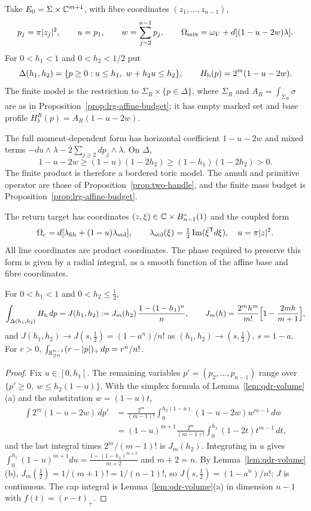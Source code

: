 \begin{definition}\label{def:lrg-mixed-model}
Take $E_0=\Sigma\times\mathbb{C}^{m+1}$, with fibre coordinates $(z_1,\dots,z_{n-1})$,
\[
 p_j=\pi|z_j|^2,\qquad u=p_1,\qquad w=\sum_{j=2}^{n-1}p_j,\qquad
 \Omega_{\rm mix}=\omega_V+d[(1-u-2w)\lambda].
\]
For $0<h_1<1$ and $0<h_2<1/2$ put
\[
 \Delta(h_1,h_2)=\{p\ge0:u\le h_1,\ w+h_2u\le h_2\},\qquad
 \Hb(p)=2^m(1-u-2w).
\]
The finite model is the restriction to $\Sigma_R\times\{p\in\Delta\}$, where $\Sigma_R$ and $A_R=\int_{\Sigma_R}\sigma$
are as in Proposition~\ref{prop:lrg-affine-budget}; it has empty marked set and base profile $H_b^R(p)=A_R(1-u-2w)$.
\end{definition}

The full moment-dependent form has horizontal coefficient $1-u-2w$ and mixed terms
$-du\wedge\lambda-2\sum_{j\ge2}dp_j\wedge\lambda$. On $\Delta$,
\begin{equation}\label{eq:lrg-mixed-positive}
 1-u-2w\ge(1-u)(1-2h_2)\ge(1-h_1)(1-2h_2)>0.
\end{equation}
The finite product is therefore a bordered toric model. The annuli and primitive operator are those of
Proposition~\ref{prop:two-handle}, and the finite mass budget is Proposition~\ref{prop:lrg-affine-budget}.

The return target has coordinates $(z,\xi)\in\mathbb{C}\times B^{\circ}_{n-1}(1)$ and the coupled form
\[
 \Omega_c=d[\lambda_{\rm fib}+(1-u)\lambda_{\rm std}],\qquad
 \lambda_{\rm std}(\xi)=\tfrac12\operatorname{Im}(\bar\xi^{\mathsf T}d\xi),\quad u=\pi|z|^2.
\]
All line coordinates are product coordinates. The phase required to preserve this form is given by a radial integral,
as a smooth function of the affine base and fibre coordinates.

\begin{lemma}\label{lem:lrg-mixed-volume}
For $0<h_1<1$ and $0<h_2\le\frac12$,
\[
 \int_{\Delta(h_1,h_2)}H_{\mathrm b}\,dp=J(h_1,h_2):=J_m(h_2)\,\frac{1-(1-h_1)^n}{n},\qquad
 J_m(h)=\frac{2^mh^m}{m!}\Bigl[1-\frac{2mh}{m+1}\Bigr],
\]
and $J(h_1,h_2)\to J(s,\frac12)=(1-a^n)/n!$ as $(h_1,h_2)\to(s,\frac12)$, $s=1-a$. For $r>0$,
$\int_{\mathbb{R}^{n-1}_{\ge0}}(r-|p|)_+\,dp=r^n/n!$.
\end{lemma}

\begin{proof}
Fix $u\in[0,h_1]$. The remaining variables $p'=(p_2,\dots,p_{n-1})$ range over $\{p'\ge0,\ w\le h_2(1-u)\}$. With
the simplex formula of Lemma~\ref{lem:qdr-volume}(a) and the substitution $w=(1-u)t$,
\begin{align*}
 \int 2^m(1-u-2w)\,dp'&=\frac{2^m}{(m-1)!}\int_0^{h_2(1-u)}(1-u-2w)w^{m-1}\,dw\\
 &=(1-u)^{m+1}\frac{2^m}{(m-1)!}\int_0^{h_2}(1-2t)t^{m-1}\,dt,
\end{align*}
and the last integral times $2^m/(m-1)!$ is $J_m(h_2)$.
Integrating in $u$ gives $\int_0^{h_1}(1-u)^{m+1}du=\frac{1-(1-h_1)^{m+2}}{m+2}$ and $m+2=n$. By
Lemma~\ref{lem:qdr-volume}(b), $J_m(\frac12)=1/(m+1)!=1/(n-1)!$, so $J(s,\frac12)=(1-a^n)/n!$; $J$ is continuous. The cap
integral is Lemma~\ref{lem:qdr-volume}(a) in dimension $n-1$ with $f(t)=(r-t)_+$.
\end{proof}

